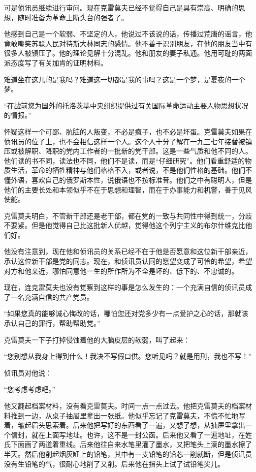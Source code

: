 可是侦讯员继续进行审问。现在克雷莫夫已经不觉得自己是具有崇高、明确的思想，随时准备为革命上断头台的强者了。

他感到自己是一个软弱、不坚定的人，他说过不该说的话，传播过荒唐的谣言，他竟敢嘲笑苏联人民对待斯大林同志的感情。他不善于识别朋友，在他的朋友当中有很多人被镇压了。他的理论见解十分混乱。他和朋友的妻子私通。他用可耻的两面派态度写了有关加肯的证明材料。

难道坐在这儿的是我吗？难道这一切都是我的事吗？这是一个梦，是夏夜的一个梦。

“在战前您为国外的托洛茨基中央组织提供过有关国际革命运动主要人物思想状况的情报。”

怀疑这样一个可鄙、肮脏的人叛变，不必是疯子，也不必是坏蛋。克雷莫夫如果在侦讯员的位子上，也不会相信这样一个人。这个人十分了解在一九三七年接替被镇压或被解职、降职的党内工作者的一批新的党干部。这是一些气质和他不同的人。他们读的书不同，读法也不同，他们不是读，而是“仔细研究”。他们看重舒适的物质生活，革命的牺牲精神与他们格格不入，或者说，不是他们性格的基础。他们不懂外语，喜欢自己的俄罗斯本性，说俄语也不按标准音。他们之中有聪明人，但是他们的主要长处和本领似乎不在于思想和理智，而在于办事能力和机警，善于见风使舵。

克雷莫夫明白，不管新干部还是老干部，都在党的一致与共同性中得到统一，分歧不要紧。但是他觉得自己比这批新人优越，觉得他这个列宁主义的布尔什维克比他们好。

他没有注意到，现在他和侦讯员的关系已经不在于他是否愿意和这位新干部亲近，承认这位新干部是党的同志。现在，和侦讯员认同的愿望变成了可怜的希望，希望对方和他亲近，哪怕同意他一生的所作所为不全是坏的、低下的、不忠诚的。

现在，连克雷莫夫也没有觉察到这样的事是怎么发生的：一个充满自信的侦讯员成了一名充满自信的共产党员。

“如果您真的能够诚心悔改的话，哪怕您还对党多少有一点爱护之心的话，那就该承认自己的罪行，帮助帮助党。”

克雷莫夫一下子打掉侵蚀着他的大脑皮层的软弱，叫了起来：

“您别想从我身上得到什么！我决不写假口供。您听见吗？就是用刑，我也不写！”

侦讯员对他说：

“您考虑考虑吧。”

他又翻起档案材料，没有看克雷莫夫。时间一点一点过去。他把克雷莫夫的档案材料推到一边，从桌子抽屉里拿出一张纸。他似乎忘记了克雷莫夫，不慌不忙地写着，皱起眉头思索着。后来他把写好的东西看了一遍，又想了想，从抽屉里拿出一个信封，就在上面写地址。也许，这不是一封公函。后来他又看了一遍地址，在姓氏下面画了两道着重线。后来他往自来水笔里灌了墨水，又把笔头上滴的墨水擦了半天。然后他削起烟灰缸上的铅笔，其中有一支铅笔的铅芯一削就断，但是侦讯员没有生铅笔的气，很耐心地削了又削。后来他在指头上试了试铅笔尖儿。

